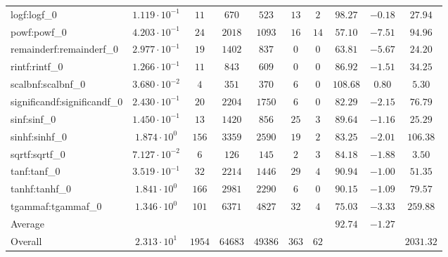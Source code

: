 \begin{tabular}{|l|c|c|c|c|c|c|c|c|c|}
logf:logf\_0                 & $ 1.119 \cdot 10^{-1} $ & $ 11     $ & $ 670   $ & $ 523   $ & $ 13  $ & $ 2  $ & $ 98.27       $ & $ -0.18   $ & $ 27.94   $ \\
powf:powf\_0                 & $ 4.203 \cdot 10^{-1} $ & $ 24     $ & $ 2018  $ & $ 1093  $ & $ 16  $ & $ 14 $ & $ 57.10       $ & $ -7.51   $ & $ 94.96   $ \\
remainderf:remainderf\_0     & $ 2.977 \cdot 10^{-1} $ & $ 19     $ & $ 1402  $ & $ 837   $ & $ 0   $ & $ 0  $ & $ 63.81       $ & $ -5.67   $ & $ 24.20   $ \\
rintf:rintf\_0               & $ 1.266 \cdot 10^{-1} $ & $ 11     $ & $ 843   $ & $ 609   $ & $ 0   $ & $ 0  $ & $ 86.92       $ & $ -1.51   $ & $ 34.25   $ \\
scalbnf:scalbnf\_0           & $ 3.680 \cdot 10^{-2} $ & $ 4      $ & $ 351   $ & $ 370   $ & $ 6   $ & $ 0  $ & $ 108.68      $ & $ 0.80    $ & $ 5.30    $ \\
significandf:significandf\_0 & $ 2.430 \cdot 10^{-1} $ & $ 20     $ & $ 2204  $ & $ 1750  $ & $ 6   $ & $ 0  $ & $ 82.29       $ & $ -2.15   $ & $ 76.79   $ \\
sinf:sinf\_0                 & $ 1.450 \cdot 10^{-1} $ & $ 13     $ & $ 1420  $ & $ 856   $ & $ 25  $ & $ 3  $ & $ 89.64       $ & $ -1.16   $ & $ 25.29   $ \\
sinhf:sinhf\_0               & $ 1.874 \cdot 10^{0}  $ & $ 156    $ & $ 3359  $ & $ 2590  $ & $ 19  $ & $ 2  $ & $ 83.25       $ & $ -2.01   $ & $ 106.38  $ \\
sqrtf:sqrtf\_0               & $ 7.127 \cdot 10^{-2} $ & $ 6      $ & $ 126   $ & $ 145   $ & $ 2   $ & $ 3  $ & $ 84.18       $ & $ -1.88   $ & $ 3.50    $ \\
tanf:tanf\_0                 & $ 3.519 \cdot 10^{-1} $ & $ 32     $ & $ 2214  $ & $ 1446  $ & $ 29  $ & $ 4  $ & $ 90.94       $ & $ -1.00   $ & $ 51.35   $ \\
tanhf:tanhf\_0               & $ 1.841 \cdot 10^{0}  $ & $ 166    $ & $ 2981  $ & $ 2290  $ & $ 6   $ & $ 0  $ & $ 90.15       $ & $ -1.09   $ & $ 79.57   $ \\
tgammaf:tgammaf\_0           & $ 1.346 \cdot 10^{0}  $ & $ 101    $ & $ 6371  $ & $ 4827  $ & $ 32  $ & $ 4  $ & $ 75.03       $ & $ -3.33   $ & $ 259.88  $ \\
\hline
Average                      & $                     $ & $        $ & $       $ & $       $ & $     $ & $    $ & $ 92.74       $ & $ -1.27   $ & $         $ \\
\hline
Overall                      & $ 2.313 \cdot 10^{1}  $ & $ 1954   $ & $ 64683 $ & $ 49386 $ & $ 363 $ & $ 62 $ & $             $ & $         $ & $ 2031.32 $ \\
\hline
\end{tabular}
